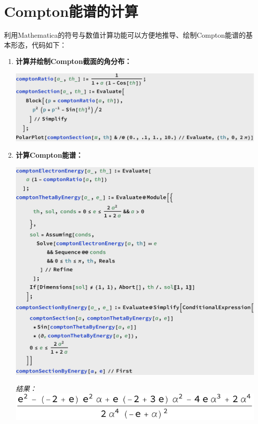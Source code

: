\documentclass[aps,pre,12pt,preprint,%
	onecolumn,showpacs,showkeys,nofootinbib]{revtex4-1}
\begin{document}
\section{Compton能谱的计算}
	利用Mathematica的符号与数值计算功能可以方便地推导、绘制Compton能谱的基本形态，代码如下：
	\begin{enumerate}
	\item \textbf{计算并绘制Compton截面的角分布：}\par\vspace{1ex}
	\qquad\qquad\includegraphics[scale=.6]{data/comptonAngleDist.pdf}
	\item \textbf{计算Compton能谱：}\par\vspace{1ex}
	\qquad\qquad\includegraphics[scale=.6]{data/comptonSectionByEnergy.pdf}\par
	\qquad\qquad \textit{结果：}\includegraphics[scale=.6]{data/comptonSectionByEnergyOut.pdf}

\end{enumerate}
\end{document}
